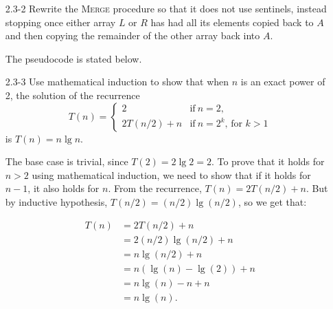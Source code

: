 \begin{enumerate}
\begin{framed}
\end{framed}

\item[2.3{-}2]{Rewrite the \textsc{Merge} procedure so that it does not use
sentinels, instead stopping once either array $L$ or $R$ has had all its
elements copied back to $A$ and then copying the remainder of the other
array back into $A$.}

\begin{framed}
The pseudocode is stated below.\\
\begin{algorithm}[H]
\SetAlgoNoEnd\DontPrintSemicolon
\BlankLine
{}
\end{algorithm}
\end{framed}

\item[2.3{-}3]{Use mathematical induction to show that when $n$ is an exact
power of 2, the solution of the recurrence
\begin{equation*}
  T(n) =
    \begin{cases}
      2 & \text{if}\ n=2 \text{,} \\
      2 T(n/2) + n & \text{if}\ n = 2^k \text{, for } k> 1
    \end{cases}
\end{equation*}
is $T(n) = n \lg n$.
}

\begin{framed}
  The base case is trivial, since $T(2) = 2 \lg 2 = 2$. To prove that it holds
  for $n > 2$ using mathematical induction, we need to show that if it holds for
  $n - 1$, it also holds for $n$. From the recurrence, $T(n) = 2T(n / 2) + n$.
  But by inductive hypothesis, $T(n / 2) = (n / 2) \lg (n / 2)$, so we get that:

  \begin{equation*}
  \begin{split}
    T(n) & = 2T(n/2) + n\\
         & = 2 (n / 2) \lg (n / 2) + n\\
         & = n \lg (n / 2) + n\\
         & = n (\lg (n) - \lg(2)) + n\\
         & = n \lg (n) - n + n\\
         & = n \lg (n).\\
  \end{split}
  \end{equation*}


\end{framed}
\end{enumerate}
